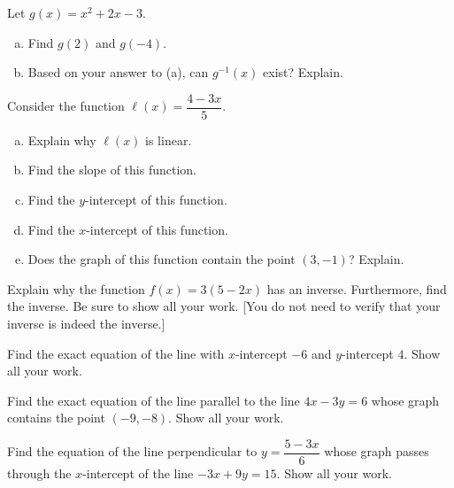 \documentclass[12pt,letterpaper]{exam}
\begin{document}
\begin{questions}
\newpage
\question[10] Let $g(x)= x^2 + 2x - 3$. 
	\begin{enumerate}[(a)]
	\item Find $g(2)$ and $g(-4)$.
	\item Based on your answer to (a), can $g^{-1}(x)$ exist? Explain. 
	\end{enumerate}



\newpage
\question[10] Consider the function $\ell(x)= \dfrac{4 - 3x}{5}$. 
	\begin{enumerate}[(a)]
	\item Explain why $\ell(x)$ is linear. 
	\item Find the slope of this function.
	\item Find the $y$-intercept of this function.
	\item Find the $x$-intercept of this function.
	\item Does the graph of this function contain the point $(3, -1)$? Explain. 
	\end{enumerate}



\newpage
\question[10] Explain why the function $f(x)= 3(5 - 2x)$ has an inverse. Furthermore, find the inverse. Be sure to show all your work. [You do not need to verify that your inverse is indeed the inverse.]



\newpage
\question[10] Find the exact equation of the line with $x$-intercept $-6$ and $y$-intercept $4$. Show all your work.



\newpage
\question[10] Find the exact equation of the line parallel to the line $4x - 3y= 6$ whose graph contains the point $(-9, -8)$. Show all your work.



\newpage
\question[10] Find the equation of the line perpendicular to $y= \dfrac{5 - 3x}{6}$ whose graph passes through the $x$-intercept of the line $-3x + 9y= 15$. Show all your work.


\end{questions}
\end{document}
